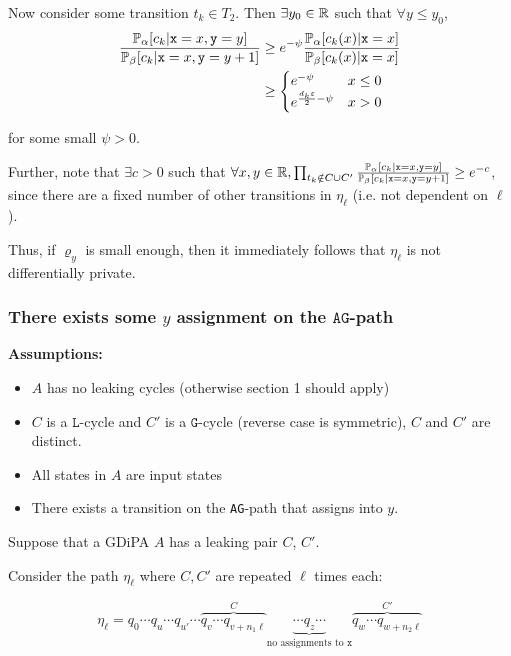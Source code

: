 Now consider some transition $t_k\in T_2$. Then $\exists y_0\in \mathbb{R}$ such that $\forall y\leq y_0$, \begin{align*}
	\frac{\mathbb{P}_\alpha[c_k|\texttt{x}=x, \texttt{y}=y]}{\mathbb{P}_\beta[c_k|\texttt{x}=x, \texttt{y}=y+1]}&\geq e^{-\psi}\frac{\mathbb{P}_\alpha[c_k(x)|\texttt{x}=x]}{\mathbb{P}_\beta[c_k(x)|\texttt{x}=x]}\\
	&\geq \begin{cases}
		e^{-\psi}& x\leq 0\\
		e^{\frac{d_{k}\varepsilon}{2}-\psi} & x> 0
	\end{cases}
\end{align*}

for some small $\psi>0$. 

Further, note that $\exists c>0$ such that $\forall x, y\in \mathbb{R}, \prod_{t_k\notin C\cup C'}\frac{\mathbb{P}_\alpha[c_k|\texttt{x}=x, \texttt{y}=y]}{\mathbb{P}_\beta[c_k|\texttt{x}=x, \texttt{y}=y+1]}\geq e^{-c}$, since there are a fixed number of other transitions in $\eta_\ell$ (i.e. not dependent on $\ell$). 

Thus, if $\varrho_y$ is small enough, then it immediately follows that $\eta_\ell$ is not differentially private. 

\subsubsection{There exists some $y$ assignment on the $\texttt{AG}$-path}\label{goodleakingpairs}

\textbf{Assumptions:}
\begin{itemize}
    \item $A$ has no leaking cycles (otherwise section 1 should apply)
    \item $C$ is a $\texttt{L}$-cycle and $C'$ is a $\texttt{G}$-cycle (reverse case is symmetric), $C$ and $C'$ are distinct.
    \item All states in $A$ are input states
    \item There exists a transition on the \texttt{AG}-path that assigns into $y$. 
\end{itemize}

Suppose that a GDiPA $A$ has a leaking pair $C$, $C'$.

Consider the path $\eta_\ell$ where $C, C'$ are repeated $\ell$ times each:

\[\eta_\ell = q_0\cdots q_u \cdots q_{u'} \cdots \overbrace{q_v\cdots q_{v+n_1\ell}}^{C}\underbrace{\cdots q_z\cdots}_{\text{no assignments to }\texttt{x}} \overbrace{q_w\cdots q_{w+n_2\ell}}^{C'}\]

